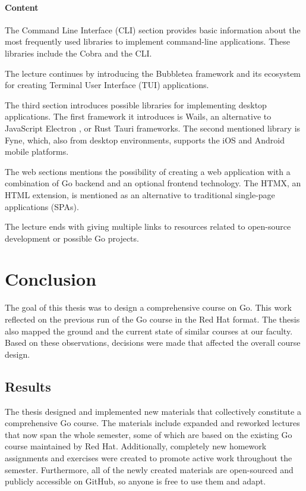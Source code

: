 \documentclass[
  digital,
  color,
  oneside,
  nosansbold,
  nocolorbold,
  nolof,
  nolot,
]{fithesis4}
\begin{document}
\subsubsection{Content}

The Command Line Interface (CLI) section provides basic information about the most frequently used libraries to implement command-line applications. These libraries include the Cobra\cite{spf13-cobra} and the CLI\cite{urfave-cli}.

The lecture continues by introducing the Bubbletea\cite{charmbracelet-bubbletea} framework and its ecosystem for creating Terminal User Interface (TUI) applications.

The third section introduces possible libraries for implementing desktop applications. The first framework it introduces is Wails\cite{wailsapp-wails}, an alternative to JavaScript Electron \cite{electron-electron}, or Rust Tauri\cite{tauri-apps-tauri} frameworks. The second mentioned library is Fyne\cite{fyne-io-fyne}, which, also from desktop environments, supports the iOS and Android mobile platforms.

The web sections mentions the possibility of creating a web application with a combination of Go backend and an optional frontend technology. The HTMX\cite{bigskysoftware-htmx}, an HTML extension, is mentioned as an alternative to traditional single-page applications (SPAs).

The lecture ends with giving multiple links to resources related to open-source development or possible Go projects.

\chapter{Conclusion}\label{chapter-conclusion}

The goal of this thesis was to design a comprehensive course on Go. This work reflected on the previous run of the Go course in the Red Hat format. The thesis also mapped the ground and the current state of similar courses at our faculty. Based on these observations, decisions were made that affected the overall course design.

\section{Results}

The thesis designed and implemented new materials that collectively constitute a comprehensive Go course. The materials include expanded and reworked lectures that now span the whole semester, some of which are based on the existing Go course maintained by Red Hat. Additionally, completely new homework assignments and exercises were created to promote active work throughout the semester. Furthermore, all of the newly created materials are open-sourced and publicly accessible on GitHub, so anyone is free to use them and adapt.
\end{document}
